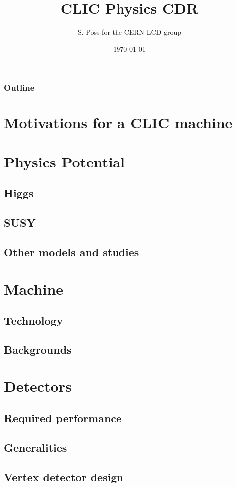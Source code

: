 \documentclass{beamer}
\author{S. Poss for the CERN LCD group}
\institute[CERN]{CERN}
\title[]{CLIC Physics CDR}
\date{\today}
\begin{document}
\begin{frame}
	\titlepage
\end{frame}

\begin{frame}
\frametitle{Outline}
\tableofcontents
\end{frame}

\section{Motivations for a CLIC machine}

\section{Physics Potential}
\subsection{Higgs}
\subsection{SUSY}
\subsection{Other models and studies}

\section{Machine}
\subsection{Technology}
\subsection{Backgrounds}

\section{Detectors}
\subsection{Required performance}
\subsection{Generalities}
\subsection{Vertex detector design}
\end{document}
